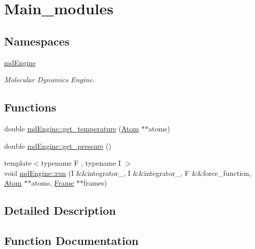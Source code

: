 \hypertarget{group___main__modules}{}\section{Main\+\_\+modules}
\label{group___main__modules}
\subsection*{Namespaces}
\begin{DoxyCompactItemize}
\item 
 \mbox{\hyperlink{namespacemd_engine}{md\+Engine}}
\begin{DoxyCompactList}\small\item\em Molecular Dynamics Engine. \end{DoxyCompactList}\end{DoxyCompactItemize}
\subsection*{Functions}
\begin{DoxyCompactItemize}
\item 
double \mbox{\hyperlink{group___main__modules_ga5f8cc3610166e26157ab48c1905bd2b7}{md\+Engine\+::get\+\_\+temperature}} (\mbox{\hyperlink{class_atom}{Atom}} $\ast$$\ast$atoms)
\item 
double \mbox{\hyperlink{group___main__modules_ga43703c5bde3f0a0ffd916e8c030d5d33}{md\+Engine\+::get\+\_\+pressure}} ()
\item 
{\footnotesize template$<$typename F , typename I $>$ }\\void \mbox{\hyperlink{group___main__modules_ga9814b46948bb9bf9930a3a9392aa3a94}{md\+Engine\+::run}} (I \&\&integrator\+\_, I \&\&integrator\+\_, F \&\&force\+\_\+function, \mbox{\hyperlink{class_atom}{Atom}} $\ast$$\ast$atoms, \mbox{\hyperlink{class_frame}{Frame}} $\ast$$\ast$frames)
\end{DoxyCompactItemize}


\subsection{Detailed Description}


\subsection{Function Documentation}
\mbox{\label{group___main__modules_ga43703c5bde3f0a0ffd916e8c030d5d33}} 
